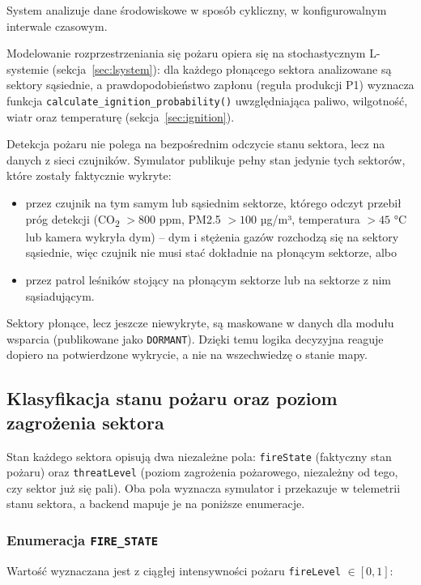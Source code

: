 System analizuje dane środowiskowe w sposób cykliczny, w konfigurowalnym interwale czasowym.

Modelowanie rozprzestrzeniania się pożaru opiera się na stochastycznym L-systemie (sekcja~\ref{sec:lsystem}): dla każdego płonącego sektora analizowane są sektory sąsiednie, a prawdopodobieństwo zapłonu (reguła produkcji P1) wyznacza funkcja \texttt{calculate\_ignition\_probability()} uwzględniająca paliwo, wilgotność, wiatr oraz temperaturę (sekcja~\ref{sec:ignition}).

Detekcja pożaru nie polega na bezpośrednim odczycie stanu sektora, lecz na danych z sieci czujników. Symulator publikuje pełny stan jedynie tych sektorów, które zostały faktycznie wykryte:
\begin{itemize}
    \item przez czujnik na tym samym lub sąsiednim sektorze, którego odczyt przebił próg detekcji (CO\textsubscript{2} $> 800$ ppm, PM2.5 $> 100$ µg/m³, temperatura $> 45$ °C lub kamera wykryła dym) -- dym i stężenia gazów rozchodzą się na sektory sąsiednie, więc czujnik nie musi stać dokładnie na płonącym sektorze, albo
    \item przez patrol leśników stojący na płonącym sektorze lub na sektorze z nim sąsiadującym.
\end{itemize}

Sektory płonące, lecz jeszcze niewykryte, są maskowane w danych dla modułu wsparcia (publikowane jako \texttt{DORMANT}). Dzięki temu logika decyzyjna reaguje dopiero na potwierdzone wykrycie, a nie na wszechwiedzę o stanie mapy.

\subsection{Klasyfikacja stanu pożaru oraz poziom zagrożenia sektora}
\label{sec:fire-threat-enums}

Stan każdego sektora opisują dwa niezależne pola: \texttt{fireState} (faktyczny stan pożaru) oraz \texttt{threatLevel} (poziom zagrożenia pożarowego, niezależny od tego, czy sektor już się pali). Oba pola wyznacza symulator i przekazuje w telemetrii stanu sektora, a backend mapuje je na poniższe enumeracje.

\subsubsection*{Enumeracja \texttt{FIRE\_STATE}}

Wartość wyznaczana jest z ciągłej intensywności pożaru \texttt{fireLevel} $\in [0,1]$:

